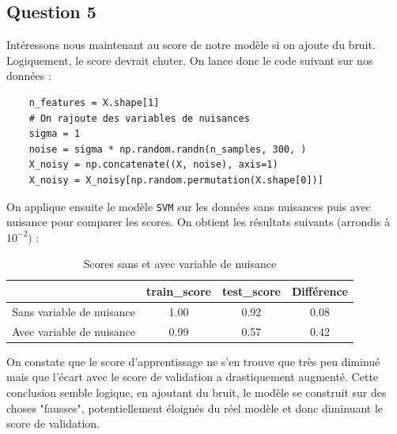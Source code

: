 \documentclass[11pt,a4paper]{article}
\begin{document}
\subsection*{Question 5}
Intéressons nous maintenant au score de notre modèle si on ajoute du bruit. Logiquement, le score devrait chuter. On lance donc le code suivant sur nos données :
\begin{verbatim}
    n_features = X.shape[1]
    # On rajoute des variables de nuisances
    sigma = 1
    noise = sigma * np.random.randn(n_samples, 300, )
    X_noisy = np.concatenate((X, noise), axis=1)
    X_noisy = X_noisy[np.random.permutation(X.shape[0])]
\end{verbatim}
On applique ensuite le modèle \texttt{SVM} sur les données sans nuisances puis avec nuisance pour comparer les scores. On obtient les résultats suivants (arrondis à $10^{-2})$ :
\begin{table}[H]
    \centering
    \begin{tabular}{|c|c|c|c|}
        \hline
        & train\_score & test\_score & Différence \\ 
        \hline
        Sans variable de nuisance & 1.00 & 0.92 & 0.08 \\
        \hline
        Avec variable de nuisance & 0.99 & 0.57 & 0.42 \\
        \hline
    \end{tabular}
    \caption{Scores sans et avec variable de nuisance}
    \label{Scores bruit}
\end{table}
On constate que le score d'apprentissage ne s'en trouve que très peu diminué mais que l'écart avec le score de validation a drastiquement augmenté. Cette conclusion semble logique, en ajoutant du bruit, le modèle se construit sur des choses "fausses", potentiellement éloignés du réel modèle et donc diminuant le score de validation.\\
\end{document}
